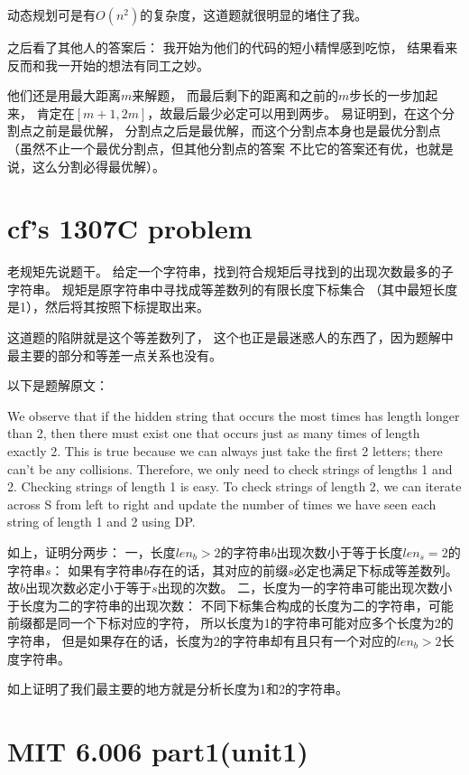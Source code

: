 动态规划可是有$O(n^2)$的复杂度，这道题就很明显的堵住了我。

之后看了其他人的答案后：
我开始为他们的代码的短小精悍感到吃惊，
结果看来反而和我一开始的想法有同工之妙。

他们还是用最大距离$m$来解题，
而最后剩下的距离和之前的$m$步长的一步加起来，
肯定在$[m+1, 2m]$，故最后最少必定可以用到两步。
易证明到，在这个分割点之前是最优解，
分割点之后是最优解，而这个分割点本身也是最优分割点
（虽然不止一个最优分割点，但其他分割点的答案
不比它的答案还有优，也就是说，这么分割必得最优解）。


\section{cf's 1307C problem}

老规矩先说题干。
给定一个字符串，找到符合规矩后寻找到的出现次数最多的子字符串。
规矩是原字符串中寻找成等差数列的有限长度下标集合
（其中最短长度是1），然后将其按照下标提取出来。

这道题的陷阱就是这个等差数列了，
这个也正是最迷惑人的东西了，因为题解中最主要的部分和等差一点关系也没有。

以下是题解原文：

We observe that if the hidden string that occurs the most times has length
longer than 2, then there must exist one that occurs just as many times of
length exactly 2. This is true because we can always just take the first 2
letters; there can't be any collisions. Therefore, we only need to check strings
of lengths 1 and 2. Checking strings of length 1 is easy. To check strings of
length 2, we can iterate across S from left to right and update the number of
times we have seen each string of length 1 and 2 using DP.

如上，证明分两步：
一，长度$len_b>2$的字符串$b$出现次数小于等于长度$len_s=2$的字符串$s$：
如果有字符串$b$存在的话，其对应的前缀$s$必定也满足下标成等差数列。
故$b$出现次数必定小于等于$s$出现的次数。
二，长度为一的字符串可能出现次数小于长度为二的字符串的出现次数：
不同下标集合构成的长度为二的字符串，可能前缀都是同一个下标对应的字符，
所以长度为1的字符串可能对应多个长度为2的字符串，
但是如果存在的话，长度为2的字符串却有且只有一个对应的$len_b>2$长度字符串。

如上证明了我们最主要的地方就是分析长度为1和2的字符串。


\section{MIT 6.006 part1(unit1)}

